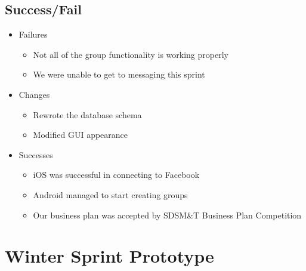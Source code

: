 \subsection{Success/Fail}
\begin{itemize}
	\item Failures
	\begin{itemize}
		\item Not all of the group functionality is working properly
		\item We were unable to get to messaging this sprint
	\end{itemize}
	\item Changes
	\begin{itemize}
		\item Rewrote the database schema
		\item Modified GUI appearance
	\end{itemize}
	\item Successes
	\begin{itemize}
		\item iOS was successful in connecting to Facebook
		\item Android managed to start creating groups
		\item Our business plan was accepted by SDSM\&T Business Plan Competition
	\end{itemize}
\end{itemize}

\section{Winter Sprint Prototype}
